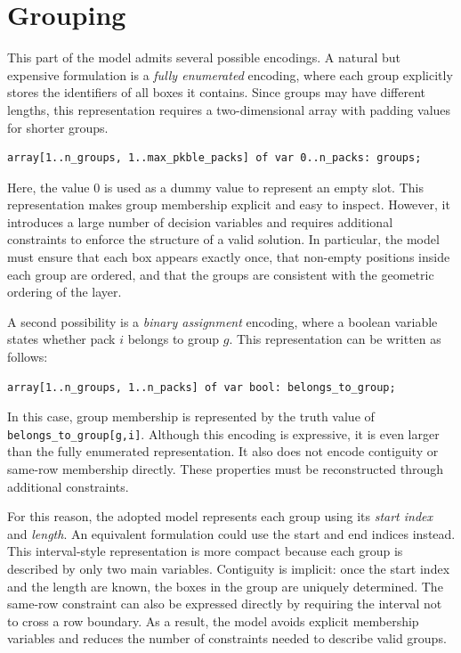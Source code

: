 \section{Grouping}
\label{sec:model}
This part of the model admits several possible encodings. A natural but
expensive formulation is a \emph{fully enumerated} encoding, where each group
explicitly stores the identifiers of all boxes it contains. Since groups may
have different lengths, this representation requires a two-dimensional
array with padding values for shorter groups.
\vspace{0.5cm}
\begin{lstlisting}
array[1..n_groups, 1..max_pkble_packs] of var 0..n_packs: groups;
\end{lstlisting}
\vspace{0.5cm}
Here, the value \(0\) is used as a dummy value to represent an empty slot.
This representation makes group membership explicit and easy to inspect.
However, it introduces a large number of decision variables and requires
additional constraints to enforce the structure of a valid solution. In
particular, the model must ensure that each box appears exactly once, that
non-empty positions inside each group are ordered, and that the groups are
consistent with the geometric ordering of the layer.

A second possibility is a \emph{binary assignment} encoding, where a boolean
variable states whether pack \(i\) belongs to group \(g\). This representation
can be written as follows:

\vspace{0.5cm}
\begin{lstlisting}
array[1..n_groups, 1..n_packs] of var bool: belongs_to_group;
\end{lstlisting}
\vspace{0.5cm}
In this case, group membership is represented by the truth value of
\texttt{belongs\_to\_group[g,i]}. Although this encoding is expressive, it is
even larger than the fully enumerated representation. It also does not encode
contiguity or same-row membership directly. These properties must be
reconstructed through additional constraints.

For this reason, the adopted model represents each group using its
\emph{start index} and \emph{length}. An equivalent formulation could use the
start and end indices instead. This interval-style representation is more
compact because each group is described by only two main variables. Contiguity
is implicit: once the start index and the length are known, the boxes in the
group are uniquely determined. The same-row constraint can also be expressed
directly by requiring the interval not to cross a row boundary. As a result,
the model avoids explicit membership variables and reduces the number of
constraints needed to describe valid groups.

